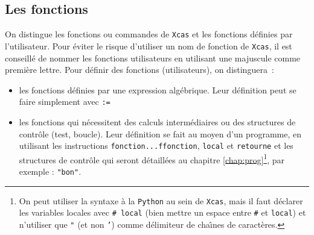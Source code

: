 \documentclass[12pt,a4paper]{book}
\begin{document}
\begin{giacjshere}
\section{Les fonctions}
On distingue les fonctions ou commandes de {\tt Xcas} et les fonctions 
d\'efinies par l'utilisateur. Pour \'eviter le risque d'utiliser un nom
de fonction de {\tt Xcas}, il est conseill\'e de nommer les fonctions
utilisateurs en utilisant une majuscule comme premi\`ere lettre.
Pour d\'efinir des fonctions (utilisateurs), 
on distinguera~:
\begin{itemize}
\item les fonctions d\'efinies par une expression alg\'ebrique.
Leur d\'efinition peut se faire simplement avec {\tt :=}
\item les fonctions qui n\'ecessitent des calculs interm\'ediaires ou
des structures de contr\^ole
(test, boucle). Leur d\'efinition se fait au moyen d'un 
programme, en utilisant les instructions 
{\tt fonction...ffonction}, {\tt local} et {\tt retourne} et
les structures de contr\^ole qui seront d\'etaill\'ees au chapitre
\ref{chap:prog}\footnote{On peut utiliser la syntaxe \`a la {\tt Python} au 
sein de {\tt Xcas}, mais il faut d\'eclarer les variables locales 
avec {\tt \# local} (bien mettre un espace entre {\tt \#} et {\tt local}) et 
n'utiliser que {\tt "} (et non  {\tt '}) comme d\'elimiteur de cha\^{\i}nes de 
caract\`eres.}, par exemple : {\tt "bon"}. 
\end{itemize}

\end{giacjshere}
\end{document}
